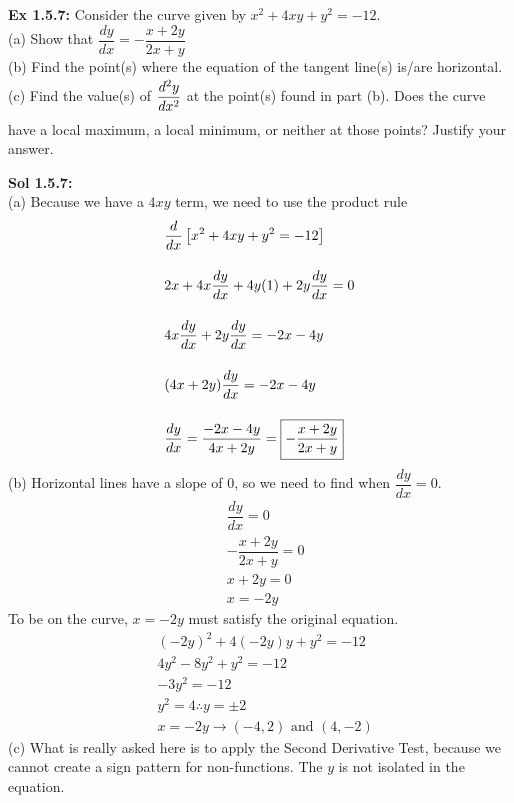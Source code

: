 \begin{tcolorbox}[example]
    \textbf{Ex 1.5.7: } Consider the curve given by $x^2 + 4xy + y^2 = -12$. \\[11pt]

    (a) Show that $\dfrac{dy}{dx} = -\dfrac{x + 2y}{2x + y}$ \\[11pt]
    (b) Find the point(s) where the equation of the tangent line(s) is/are horizontal. \\[11pt]
    (c) Find the value(s) of $\dfrac{d^2y}{dx^2} \forcespace$ at the point(s) found in part (b). Does the curve have a local maximum, a local minimum, or neither at those points? Justify your answer.
\end{tcolorbox} 
\begin{tcolorbox}[solution]
    \textbf{Sol 1.5.7: } \\[11pt]
    (a) Because we have a $4xy$ term, we need to use the product rule \begin{align*}
        & \dfrac{d}{dx} \left[x^2 + 4xy + y^2 = -12\right] \\[11pt]
        & 2x + 4x\dfrac{dy}{dx} + 4y(1) + 2y\dfrac{dy}{dx} = 0 \\[11pt]
        & 4x\dfrac{dy}{dx}+ 2y\dfrac{dy}{dx} = -2x - 4y \\[11pt]
        & (4x + 2y)\dfrac{dy}{dx} = -2x - 4y \\[11pt]
        & \dfrac{dy}{dx} = \dfrac{-2x - 4y}{4x + 2y} = \boxed{-\dfrac{x + 2y}{2x + y}}
    \end{align*}
    (b) Horizontal lines have a slope of $0$, so we need to find when $\dfrac{dy}{dx} = 0$. \begin{align*}
        & \dfrac{dy}{dx} = 0 \\[11pt]
        & -\dfrac{x + 2y}{2x + y} = 0 \\[11pt]
        & x + 2y = 0 \\[11pt]
        & x = -2y
    \end{align*}
    To be on the curve, $x = -2y$ must satisfy the original equation. \begin{align*}
        & (-2y)^2 + 4(-2y)y + y^2 = -12 \\[11pt]
        & 4y^2 - 8y^2 + y^2 = -12 \\[11pt]
        & -3y^2 = -12 \\[11pt]
        & y^2 = 4 \therefore y = \pm 2 \\[11pt]
        & x = -2y \rightarrow \boxed{(-4, 2) \text{ and } (4, -2)}
    \end{align*}
    (c) What is really asked here is to apply the Second Derivative Test, because we cannot create a sign pattern for non-functions. The $y$ is not isolated in the equation. \begin{align*}

\end{align*}
\end{tcolorbox}
